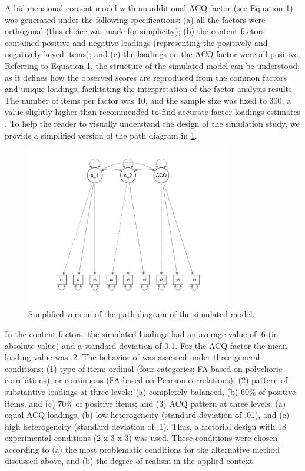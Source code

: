 A bidimensional content model with an additional ACQ factor (see Equation 1) was generated under the following specifications: (a) all the factors were orthogonal (this choice was made for simplicity); (b) the content factors contained positive and negative loadings (representing the positively and negatively keyed items); and (c) the loadings on the ACQ factor were all positive. Referring to Equation 1, the structure of the simulated model can be understood, as it defines how the observed scores are reproduced from the common factors and unique loadings, facilitating the interpretation of the factor analysis results. The number of items per factor was 10, and the sample size was fixed to 300, a value slightly higher than recommended to find accurate factor loadings estimates \citep{Fabrigar:1999}. To help the reader to visually understand the design of the simulation study, we provide a simplified version of the path diagram in \cref{fig:1}.

\begin{figure}[h]
  \centering
  \includegraphics[width=0.8\textwidth]{toyimage.jpeg}
  \caption{Simplified version of the path diagram of the simulated model.}
  \label{fig:1}
\end{figure}

In the content factors, the simulated loadings had an average value of .6 (in absolute value) and a standard deviation of 0.1. For the ACQ factor the mean loading value was .2. The behavior of  was assessed under three general conditions: (1) type of item: ordinal (four categories; FA based on polychoric correlations), or continuous (FA based on Pearson correlations); (2) pattern of substantive loadings at three levels: (a) completely balanced, (b)  60\% of positive items, and (c) 70\% of positive items; and (3) ACQ pattern at three levels: (a) equal ACQ loadings, (b) low heterogeneity (standard deviation of .01), and (c) high heterogeneity (standard deviation of .1). Thus, a factorial design with 18 experimental conditions (2 x 3 x 3) was used. These conditions were chosen according to (a) the most problematic conditions for the alternative method discussed above, and (b) the degree of realism in the applied context.

